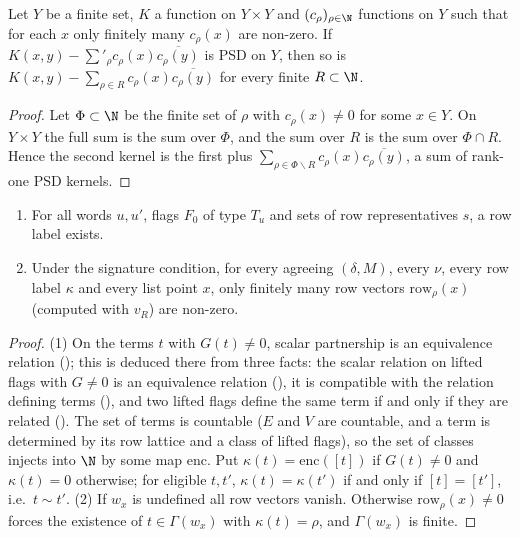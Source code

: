 \begin{lemma}\label{pf:thmS-leaves:lem:psdfull}
Let $Y$ be a finite set, $K$ a function on $Y\times Y$ and $(c_\rho)_{\rho\in\N}$ functions on $Y$ such that for each $x$
only finitely many $c_\rho(x)$ are non-zero. If $K(x,y)-\sum'_\rho c_\rho(x)\overline{c_\rho(y)}$ is PSD on $Y$, then so is
$K(x,y)-\sum_{\rho\in R}c_\rho(x)\overline{c_\rho(y)}$ for every finite $R\subset\N$.
\end{lemma}

\begin{proof}
Let $\Phi\subset\N$ be the finite set of $\rho$ with $c_\rho(x)\ne0$ for some $x\in Y$. On $Y\times Y$ the full sum is the
sum over $\Phi$, and the sum over $R$ is the sum over $\Phi\cap R$. Hence the second kernel is the first plus
$\sum_{\rho\in\Phi\smallsetminus R}c_\rho(x)\overline{c_\rho(y)}$, a sum of rank-one PSD kernels.
\end{proof}

\begin{lemma}\label{pf:thmS-leaves:lem:labels}
\begin{enumerate}
\item For all words $u,u'$, flags $F_0$ of type $T_u$ and sets of row representatives $s$, a row label exists.
\item Under the signature condition, for every agreeing $(\delta,M)$, every $\nu$, every row label $\kappa$ and every list
point $x$, only finitely many row vectors $\mathrm{row}_\rho(x)$ (computed with $v_R$) are non-zero.
\end{enumerate}
\end{lemma}

\begin{proof}
(1) On the terms $t$ with $G(t)\ne0$, scalar partnership is an equivalence relation
(); this is deduced there from three facts: the scalar relation on lifted
flags with $G\ne0$ is an equivalence relation (), it is compatible with
the relation defining terms (), and two lifted flags define the same
term if and only if they are related (). The set of terms is countable
($E$ and $V$ are countable, and a term is determined by its row lattice and a class of lifted flags), so the set of classes
injects into $\N$ by some map $\mathrm{enc}$. Put $\kappa(t)=\mathrm{enc}([t])$ if $G(t)\ne0$ and $\kappa(t)=0$ otherwise; for
eligible $t,t'$, $\kappa(t)=\kappa(t')$ if and only if $[t]=[t']$, i.e.\ $t\sim t'$. (2) If $w_x$ is undefined all row vectors
vanish. Otherwise $\mathrm{row}_\rho(x)\ne0$ forces the existence of $t\in\Gamma(w_x)$ with $\kappa(t)=\rho$, and $\Gamma(w_x)$ is
finite.
\end{proof}

